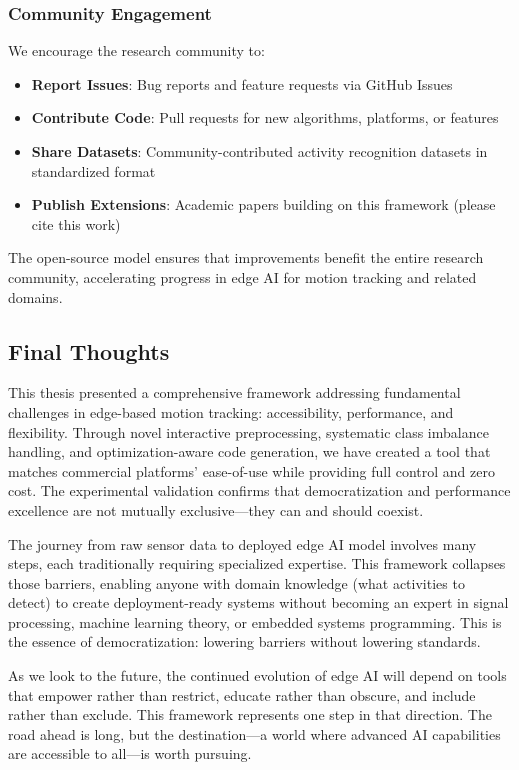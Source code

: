 \subsubsection{Community Engagement}
We encourage the research community to:
\begin{itemize}
    \item \textbf{Report Issues}: Bug reports and feature requests via GitHub Issues
    \item \textbf{Contribute Code}: Pull requests for new algorithms, platforms, or features
    \item \textbf{Share Datasets}: Community-contributed activity recognition datasets in standardized format
    \item \textbf{Publish Extensions}: Academic papers building on this framework (please cite this work)
\end{itemize}

The open-source model ensures that improvements benefit the entire research community, accelerating progress in edge AI for motion tracking and related domains.

\subsection{Final Thoughts}

This thesis presented a comprehensive framework addressing fundamental challenges in edge-based motion tracking: accessibility, performance, and flexibility. Through novel interactive preprocessing, systematic class imbalance handling, and optimization-aware code generation, we have created a tool that matches commercial platforms' ease-of-use while providing full control and zero cost. The experimental validation confirms that democratization and performance excellence are not mutually exclusive—they can and should coexist.

The journey from raw sensor data to deployed edge AI model involves many steps, each traditionally requiring specialized expertise. This framework collapses those barriers, enabling anyone with domain knowledge (what activities to detect) to create deployment-ready systems without becoming an expert in signal processing, machine learning theory, or embedded systems programming. This is the essence of democratization: lowering barriers without lowering standards.

As we look to the future, the continued evolution of edge AI will depend on tools that empower rather than restrict, educate rather than obscure, and include rather than exclude. This framework represents one step in that direction. The road ahead is long, but the destination—a world where advanced AI capabilities are accessible to all—is worth pursuing.